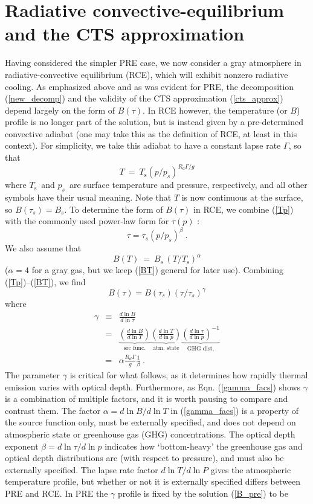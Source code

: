 \documentclass{ametsoc}
\newcommand{\beqn}{\begin{equation}}
\newcommand{\eeqn}{\end{equation}}
\newcommand{\beqa}{\begin{eqnarray}}
\newcommand{\eeqa}{\end{eqnarray}}
\newcommand{\eqnref}[1]{(\ref{#1})}
\newcommand{\der}[2]{\ensuremath{\frac{d #1}{d #2}}}
\newcommand{\Rd}{\ensuremath{R_d}}
\newcommand{\Ts}{\ensuremath{T_\mathrm{s}}}
\newcommand{\ps}{\ensuremath{p_s}}
\newcommand{\taus}{\ensuremath{\tau_s}}
\newcommand{\Bs}{\ensuremath{B_s}}
\begin{document}
\section{Radiative convective-equilibrium and the CTS approximation} \label{sec_rce}
Having considered the simpler PRE case, we now consider a gray atmosphere in radiative-convective equilibrium (RCE), which will exhibit nonzero radiative cooling. As emphasized above and as was evident for PRE, the decomposition \eqnref{new_decomp} and the validity of the CTS approximation \eqnref{cts_approx} depend largely on the form of $B(\tau)$. In RCE however,  the temperature (or $B$) profile is no longer part of the solution, but is instead given by a pre-determined convective adiabat (one may take this as the definition of RCE, at least in this context). For simplicity, we take this adiabat to have a constant lapse rate $\Gamma$, so that  
\beqn
	T \ = \ \Ts(p/\ps)^{\Rd\Gamma/g} 
	\label{Tp}
\eeqn
where \Ts\ and \ps\ are surface temperature and pressure, respectively, and all other symbols have their usual meaning. Note that $T$ is now continuous at the surface, so $B(\taus)=B_s$. To determine the form of  $B(\tau)$ in RCE, we combine \eqnref{Tp} with the commonly used power-law form for $\tau(p)$ \citep[e.g.][]{cronin2015b,robinson2012,frierson2006}:
 \beqn
 	\tau = \taus(p/\ps)^\beta  \ .
	\label{taup}
\eeqn 
We also assume that  
\beqn
	B(T)\ = \ \Bs\, (T/\Ts)^\alpha
	\label{BT}
\eeqn
($\alpha=4$ for a gray gas, but we keep \eqnref{BT} general for later use). Combining \eqnref{Tp}--\eqnref{BT}, we find
\beqn
	B(\tau) = B(\taus)(\tau/\taus)^\gamma
	\label{Btau1}
\eeqn
 where
 \begin{subequations}
	  \beqa
 		\gamma & \equiv & \der{\ln B}{\ln \tau} \label{gamma_def} \\[5pt]
					 &    = 	   & \underbrace{\left(\der{\ln B}{\ln T}\right)}_{\text{src func.}} \underbrace{\left(\der{\ln T}{\ln p}\right)}_{\text{atm. state}}\underbrace{\left(\der{\ln\tau}{\ln p}\right)^{-1}}_{\text{GHG dist.}} 
					 						\label{gamma_facs} \\[5pt]
				 	&    = 	   &  \alpha  \frac{R_d\Gamma}{g} \frac{1}{\beta} \ . \label{gamma_rce}
	\eeqa
	\label{gamma_eqns}
\end{subequations}
The parameter $\gamma$ is critical for what follows, as it determines how rapidly thermal emission varies with optical depth. Furthermore, as Eqn. \eqnref{gamma_facs} shows $\gamma$ is a combination of multiple factors, and it is worth pausing to compare and contrast them. The factor $\alpha = d \ln B/ d \ln T$ in \eqnref{gamma_facs}  is a property of the source function only, must be externally specified, and does not depend on atmospheric state or greenhouse gas (GHG) concentrations. The optical depth exponent $\beta = d\ln \tau/d \ln p$ indicates how `bottom-heavy' the greenhouse gas and optical depth distributions are (with respect to pressure), and must also be externally specified.  The lapse rate factor $d \ln T/ d\ln P$ gives the atmospheric temperature profile, but whether or not it is externally specified differs between PRE and RCE. In PRE the $\gamma$ profile is fixed by the solution \eqnref{B_pre} to be 
\end{document}
